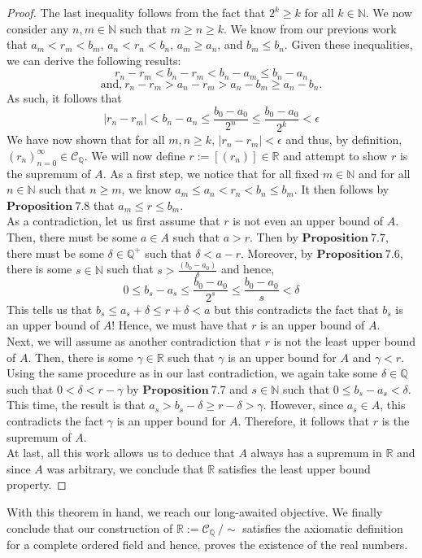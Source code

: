 \documentclass[12pt]{article}
\theoremstyle{definition}
\theoremstyle{remark}
\begin{document}
\begin{proof}
\noindent The last inequality follows from the fact that $2^k\geq k$ for all $k\in\mathbb{N}$. We now consider any $n,m\in\mathbb{N}$ such that $m\geq n\geq k$. We know from our previous work that $a_m<r_m<b_m$, $a_n<r_n<b_n$, $a_m\geq a_n$, and $b_m\leq b_n$. Given these inequalities, we can derive the following results:
$$r_n-r_m<b_n-r_m<b_n-a_m\leq b_n-a_n$$
$$\text{and,}\ r_n-r_m>a_n-r_m>a_n-b_m\geq a_n-b_n.$$
As such, it follows that
$$|r_n-r_m|<b_n-a_n\leq \frac{b_0-a_0}{2^n}\leq \frac{b_0-a_0}{2^k}<\epsilon$$
We have now shown that for all $m,n\geq k$, $|r_n-r_m|<\epsilon$ and thus, by definition, $(r_n)_{n=0}^\infty\in\mathscr{C}_\mathbb{Q}$. We will now define $r:=[(r_n)]\in\mathbb{R}$ and attempt to show $r$ is the supremum of $A$. As a first step, we notice that for all fixed $m\in\mathbb{N}$ and for all $n\in\mathbb{N}$ such that $n\geq m$, we know $a_m\leq a_n<r_n<b_n\leq b_m$. It then follows by $\mathbf{Proposition\ 7.8}$ that $a_m\leq r\leq b_m$.\\
As a contradiction, let us first assume that $r$ is not even an upper bound of $A$. Then, there must be some $a\in A$ such that $a>r$. Then by $\mathbf{Proposition\ 7.7}$, there must be some $\delta\in\mathbb{Q}^+$ such that $\delta<a-r$. Moreover, by $\mathbf{Proposition\ 7.6}$, there is some $s\in\mathbb{N}$ such that $s>\frac{(b_0-a_0)}{\delta}$ and hence,
$$0\leq b_s-a_s\leq \frac{b_0-a_0}{2^s}\leq\frac{b_0-a_0}{s}<\delta$$
This tells us that $b_s\leq a_s+\delta\leq r+\delta < a$ but this contradicts the fact that $b_s$ is an upper bound of $A$! Hence, we must have that $r$ is an upper bound of $A$.\\

\noindent Next, we will assume as another contradiction that $r$ is not the least upper bound of $A$. Then, there is some $\gamma\in\mathbb{R}$ such that $\gamma$ is an upper bound for $A$ and $\gamma< r$. Using the same procedure as in our last contradiction, we again take some $\delta\in\mathbb{Q}$ such that $0<\delta<r-\gamma$ by $\mathbf{Proposition\ 7.7}$ and $s\in\mathbb{N}$ such that $0\leq b_s-a_s<\delta$. This time, the result is that $a_s>b_s-\delta\geq r-\delta>\gamma$. However, since $a_s\in A$, this contradicts the fact $\gamma$ is an upper bound for $A$. Therefore, it follows that $r$ is the supremum of $A$.\\

\noindent At last, all this work allows us to deduce that $A$ always has a supremum in $\mathbb{R}$ and since $A$ was arbitrary, we conclude that $\mathbb{R}$ satisfies the least upper bound property.
\end{proof}
\noindent With this theorem in hand, we reach our long-awaited objective. We finally conclude that our construction of $\mathbb{R}:=\mathscr{C}_\mathbb{Q}\ /\sim$ satisfies the axiomatic definition for a complete ordered field and hence, proves the existence of the real numbers.

\newpage
\nocite{*}
\printbibliography
\end{document}
